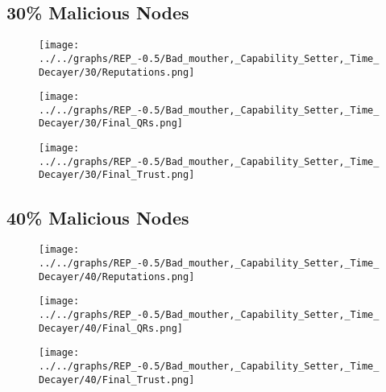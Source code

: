 \begin{minipage}[t]{0.49\columnwidth}
\subsection*{30\% Malicious Nodes}
    \begin{figure}[H]
        \centering
        \texttt{[image: ../../graphs/REP\_-0.5/Bad\_mouther,\_Capability\_Setter,\_Time\_Decayer/30/Reputations.png]}
    \end{figure}
    \begin{figure}[H]
        \centering
        \texttt{[image: ../../graphs/REP\_-0.5/Bad\_mouther,\_Capability\_Setter,\_Time\_Decayer/30/Final\_QRs.png]}
    \end{figure}
\end{minipage}
\begin{minipage}[t]{0.49\columnwidth}
    \begin{figure}[H]
        \centering
        \texttt{[image: ../../graphs/REP\_-0.5/Bad\_mouther,\_Capability\_Setter,\_Time\_Decayer/30/Final\_Trust.png]}
    \end{figure}
\end{minipage}

\begin{minipage}[t]{0.49\columnwidth}
\subsection*{40\% Malicious Nodes}
    \begin{figure}[H]
        \centering
        \texttt{[image: ../../graphs/REP\_-0.5/Bad\_mouther,\_Capability\_Setter,\_Time\_Decayer/40/Reputations.png]}
    \end{figure}
    \begin{figure}[H]
        \centering
        \texttt{[image: ../../graphs/REP\_-0.5/Bad\_mouther,\_Capability\_Setter,\_Time\_Decayer/40/Final\_QRs.png]}
    \end{figure}
\end{minipage}
\begin{minipage}[t]{0.49\columnwidth}
    \begin{figure}[H]
        \centering
        \texttt{[image: ../../graphs/REP\_-0.5/Bad\_mouther,\_Capability\_Setter,\_Time\_Decayer/40/Final\_Trust.png]}
    \end{figure}
\end{minipage}

